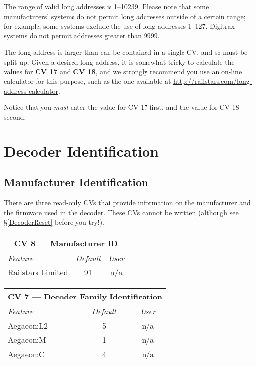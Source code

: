 \documentclass[12pt,letterpaper,draft]{memoir} %
\begin{document}
The range of valid long addresses is 1--10239. Please note that some manufacturers' systems do not permit long addresses outside of a certain range; for example, some systems exclude the use of long addresses 1--127. Digitrax systems do not permit addresses greater than 9999.

The long address is larger than can be contained in a single CV, and so must be split up. Given a desired long address, it is somewhat tricky to calculate the values for \textbf{CV 17} and \textbf{CV 18}, and we strongly recommend you use an on-line calculator for this purpose, such as the one available at \url{http://railstars.com/long-address-calculator}.

Notice that you \textit{must} enter the value for CV 17 first, and the value for CV 18 second.

\section{Decoder Identification}

\subsection{Manufacturer Identification}
\label{ManufacturerIdentification}
There are three read-only CVs that provide information on the manufacturer and the firmware used in the decoder. These CVs cannot be written (although see \S\ref{DecoderReset} before you try!).

\label{CV8}
\begin{center}
\begin{tabular}{|l|c|c|}
\hline
\multicolumn{3}{|c|}{\textbf{CV 8 --- Manufacturer ID}} \\ \hline \hline
\textit{Feature}& \textit{Default} & \textit{User} \\ \hline
Railstars Limited & 91 & n/a\\ \hline
\end{tabular}
\end{center}

\label{CV7}
\begin{center}
\begin{tabular}{|l|c|c|}
\hline
\multicolumn{3}{|c|}{\textbf{CV 7 --- Decoder Family Identification}} \\ \hline \hline
\textit{Feature}& \textit{Default} & \textit{User} \\ \hline
Aegaeon:L2 & 5 & n/a\\ \hline
Aegaeon:M & 1 & n/a\\ \hline
Aegaeon:C & 4 & n/a\\ \hline
\end{tabular}
\end{center}
\end{document}
